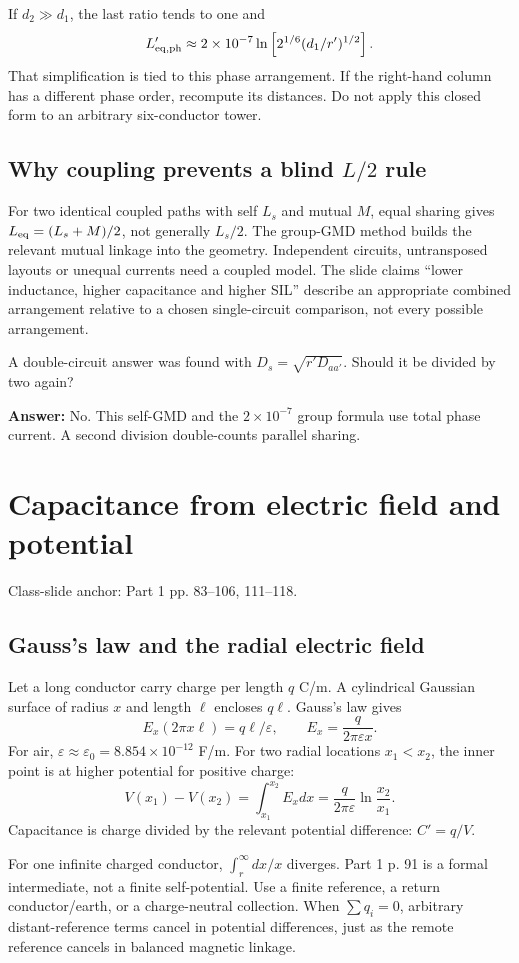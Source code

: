 \documentclass[11pt,a4paper]{article}
\newenvironment{Caution}[1]{\begin{tcolorbox}[colback=warm,colframe=rust,coltitle=white,title={#1}]}{\end{tcolorbox}}
\newcommand{\slides}[1]{{\small\color{muted}\textsf{Class-slide anchor: #1.}}\par}
\newcommand{\chapterstart}[2]{\clearpage\section{#1}\label{#2}}
\newcommand{\checkq}[2]{\begin{tcolorbox}[breakable=false,colback=pale,colframe=teal,coltitle=white,title={Check your understanding}]#1\par\textbf{Answer:} #2\end{tcolorbox}}
\newcommand{\ans}[1]{\boxed{#1}}
\begin{document}
If $d_2\gg d_1$, the last ratio tends to one and
\[
 L'_{\rm eq,ph}\approx2\times10^{-7}\ln\left[2^{1/6}(d_1/r')^{1/2}\right].
\]
That simplification is tied to this phase arrangement. If the right-hand column has a different phase order, recompute its distances. Do not apply this closed form to an arbitrary six-conductor tower.
\subsection{Why coupling prevents a blind \texorpdfstring{$L/2$}{L/2} rule}
For two identical coupled paths with self $L_s$ and mutual $M$, equal sharing gives $L_{\rm eq}=(L_s+M)/2$, not generally $L_s/2$. The group-GMD method builds the relevant mutual linkage into the geometry. Independent circuits, untransposed layouts or unequal currents need a coupled model. The slide claims ``lower inductance, higher capacitance and higher SIL'' describe an appropriate combined arrangement relative to a chosen single-circuit comparison, not every possible arrangement.
\checkq{A double-circuit answer was found with $D_s=\sqrt{r'D_{aa'}}$. Should it be divided by two again?}{No. This self-GMD and the $2\times10^{-7}$ group formula use total phase current. A second division double-counts parallel sharing.}

\chapterstart{Capacitance from electric field and potential}{capacitance}
\slides{Part 1 pp. 83--106, 111--118}
\subsection{Gauss's law and the radial electric field}
Let a long conductor carry charge per length $q$ C/m. A cylindrical Gaussian surface of radius $x$ and length $\ell$ encloses $q\ell$. Gauss's law gives
\[
 E_x(2\pi x\ell)=q\ell/\varepsilon,\qquad
 \ans{E_x=\frac{q}{2\pi\varepsilon x}}.
\]
For air, $\varepsilon\approx\varepsilon_0=8.854\times10^{-12}$ F/m. For two radial locations $x_1<x_2$, the inner point is at higher potential for positive charge:
\[
 V(x_1)-V(x_2)=\int_{x_1}^{x_2}E_xdx
 =\frac{q}{2\pi\varepsilon}\ln\frac{x_2}{x_1}.
\]
Capacitance is charge divided by the relevant potential difference: $C'=q/V$.

\begin{Caution}{Do not assign an isolated infinite line a finite potential at infinity}
For one infinite charged conductor, $\int_r^\infty dx/x$ diverges. Part 1 p. 91 is a formal intermediate, not a finite self-potential. Use a finite reference, a return conductor/earth, or a charge-neutral collection. When $\sum q_i=0$, arbitrary distant-reference terms cancel in potential differences, just as the remote reference cancels in balanced magnetic linkage.
\end{Caution}
\end{document}

